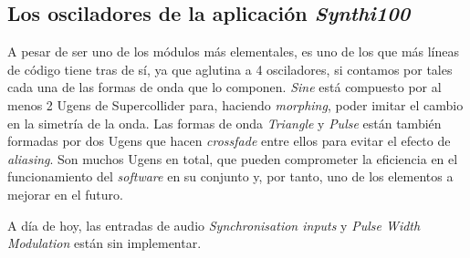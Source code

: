 \subsection{Los osciladores de la aplicación \textit{Synthi100}}
A pesar de ser uno de los módulos más elementales, es uno de los que más líneas de código tiene tras de sí, ya que aglutina a 4 osciladores, si contamos por tales cada una de las formas de onda que lo componen. \textit{Sine} está compuesto por al menos 2 Ugens de Supercollider para, haciendo \textit{morphing}, poder imitar el cambio en la simetría de la onda. Las formas de onda \textit{Triangle} y \textit{Pulse} están también formadas por dos Ugens que hacen \textit{crossfade} entre ellos para evitar el efecto de \textit{aliasing}. Son muchos Ugens en total, que pueden comprometer la eficiencia en el funcionamiento del \textit{software} en su conjunto y, por tanto, uno de los elementos a mejorar en el futuro.

A día de hoy, las entradas de audio \textit{Synchronisation inputs} y \textit{Pulse Width Modulation} están sin implementar.
